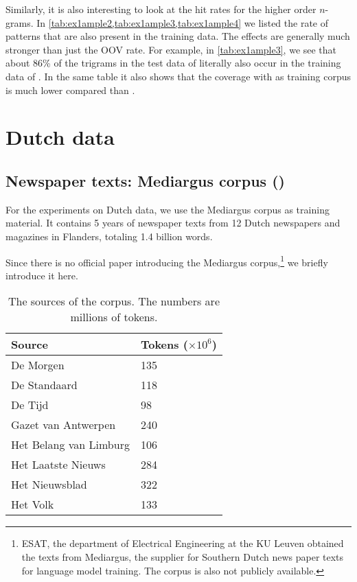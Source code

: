 Similarly, it is also interesting to look at the hit rates for the higher order $n$-grams. In \cref{tab:ex1ample2,tab:ex1ample3,tab:ex1ample4} we listed the rate of patterns that are also present in the training data. The effects are generally much stronger than just the OOV rate. For example, in \cref{tab:ex1ample3}, we see that about 86\% of the trigrams in the test data of \obw literally also occur in the training data of \obw.
In the same table it also shows that the coverage with \emea as training corpus is much lower compared than \obw.
    
\section{Dutch data}
\subsection{Newspaper texts: Mediargus corpus (\mediargus)}
For the experiments on Dutch data, we use the Mediargus corpus as training material. It contains 5 years of newspaper texts from 12 Dutch newspapers and magazines in Flanders, totaling 1.4 billion words.

Since there is no official paper introducing the Mediargus corpus,\footnote{ESAT, the department of Electrical Engineering at the KU Leuven obtained the texts from Mediargus, the supplier for Southern Dutch news paper texts for language model training. The corpus is also not publicly available.} we briefly introduce it here.

\begin{table}
	\begin{tabular}{ll}
    	Source & \thead{Tokens \\ ($\times 10^6$)} \\ \hline
    	De Morgen & 135 \\
        De Standaard & 118 \\
        De Tijd & 98 \\
        Gazet van Antwerpen & 240 \\
        Het Belang van Limburg & 106 \\
        Het Laatste Nieuws & 284 \\
        Het Nieuwsblad & 322 \\
        Het Volk & 133
    \end{tabular}
    \caption{The sources of the \mediargus corpus. The numbers are millions of tokens.}
\end{table}

